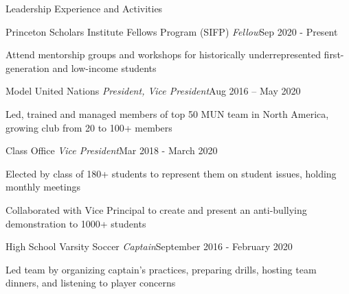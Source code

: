 \documentclass{resume} %
\begin{document}
\begin{rSection}{Leadership Experience and Activities}

\begin{rSubsection}
{Princeton Scholars Institute Fellows Program (SIFP) \normalfont\em Fellow}{Sep 2020 - Present}{}{}
\item Attend mentorship groups and workshops for historically underrepresented first-generation and low-income students
\end{rSubsection}

\begin{rSubsection}
{Model United Nations \normalfont\em President, Vice President}{Aug 2016 – May 2020}{}{}
\item Led, trained and managed members of top 50 MUN team in North America, growing club from 20 to 100+ members
\end{rSubsection}

\begin{rSubsection}
{Class Office \normalfont\em Vice President}{Mar 2018 - March 2020}{}{}
\item Elected by class of 180+ students to represent them on student issues, holding monthly meetings
\item Collaborated with Vice Principal to create and present an anti-bullying demonstration to 1000+ students
\end{rSubsection}

\begin{rSubsection}
{High School Varsity Soccer \normalfont\em Captain}{September 2016 - February 2020}{}{}
\item Led team by organizing captain's practices, preparing drills, hosting team dinners, and listening to player concerns
\end{rSubsection}

\end{rSection} 
\end{document}
